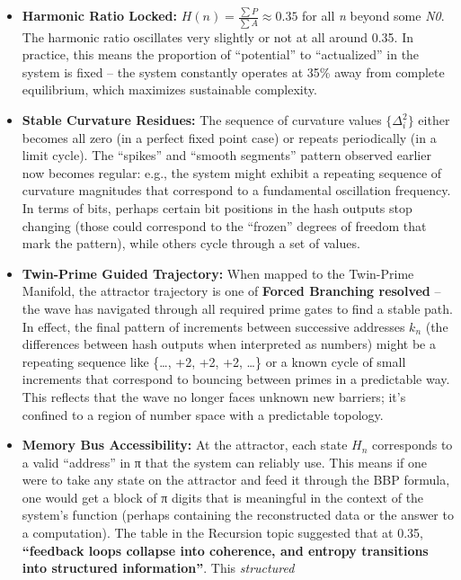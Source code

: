 \documentclass[11pt]{article}
\providecommand{\tightlist}{%
      \setlength{\itemsep}{0pt}\setlength{\parskip}{0pt}}
\begin{document}
\begin{itemize}
\tightlist
\item
  \textbf{Harmonic Ratio Locked:}
  \(H(n) = \frac{\sum P}{\sum A} \approx 0.35\) for all \emph{n} beyond
  some \emph{N0}. The harmonic ratio oscillates very slightly or not at
  all around 0.35. In practice, this means the proportion of
  ``potential'' to ``actualized'' in the system is fixed -- the system
  constantly operates at 35\% away from complete equilibrium, which
  maximizes sustainable complexity.
\item
  \textbf{Stable Curvature Residues:} The sequence of curvature values
  \(\{\Delta^2_i\}\) either becomes all zero (in a perfect fixed point
  case) or repeats periodically (in a limit cycle). The ``spikes'' and
  ``smooth segments'' pattern observed earlier now becomes regular:
  e.g., the system might exhibit a repeating sequence of curvature
  magnitudes that correspond to a fundamental oscillation frequency. In
  terms of bits, perhaps certain bit positions in the hash outputs stop
  changing (those could correspond to the ``frozen'' degrees of freedom
  that mark the pattern), while others cycle through a set of values.
\item
  \textbf{Twin-Prime Guided Trajectory:} When mapped to the Twin-Prime
  Manifold, the attractor trajectory is one of \textbf{Forced Branching
  resolved} -- the wave has navigated through all required prime gates
  to find a stable path. In effect, the final pattern of increments
  between successive addresses \(k_n\) (the differences between hash
  outputs when interpreted as numbers) might be a repeating sequence
  like \{\ldots, +2, +2, +2, \ldots\} or a known cycle of small
  increments that correspond to bouncing between primes in a predictable
  way. This reflects that the wave no longer faces unknown new barriers;
  it's confined to a region of number space with a predictable topology.
\item
  \textbf{Memory Bus Accessibility:} At the attractor, each state
  \(H_n\) corresponds to a valid ``address'' in π that the system can
  reliably use. This means if one were to take any state on the
  attractor and feed it through the BBP formula, one would get a block
  of π digits that is meaningful in the context of the system's function
  (perhaps containing the reconstructed data or the answer to a
  computation). The table in the Recursion topic suggested that at 0.35,
  \textbf{``feedback loops collapse into coherence, and entropy
  transitions into structured information''}. This \emph{structured
}
\end{itemize}
\end{document}
